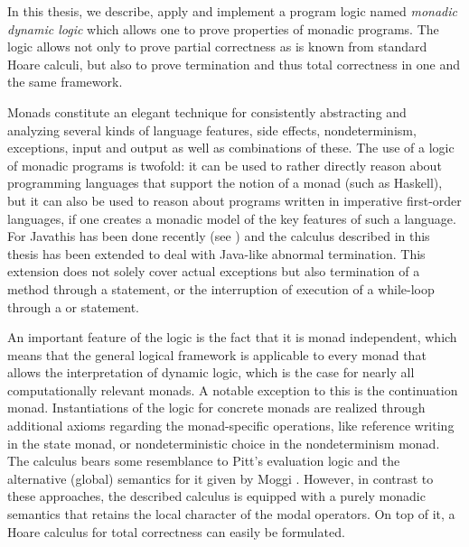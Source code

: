 In this thesis, we describe, apply and implement a program logic named
\emph{monadic dynamic logic} \cite{SchroederMossakowski:PDL} which allows one to
prove properties of monadic programs.   The logic allows
not only to prove partial correctness as is known from standard Hoare calculi,
but also to prove termination and thus total correctness in one and the same
framework.

Monads constitute an elegant technique for consistently abstracting and analyzing
several kinds of language features, \EG side effects, nondeterminism,
exceptions, input and output as well as combinations of these. The use of a
logic of monadic programs is twofold: it can be used to rather directly reason
about programming languages that support the notion of a monad (such as
Haskell), but it can also be used to reason about programs written in imperative
first-order languages, if one creates a monadic model of the key features of
such a language. For Java\TM this has been done recently (see
\cite{HuismanJacobs00}) and the calculus described in this thesis has been
extended to deal with Java\TM-like abnormal termination. This extension does not
solely cover actual exceptions but also termination of a method through a
 statement, or the interruption of execution of a while-loop
through a  or  statement.

An important feature of the logic is the fact that it is monad independent,
which means that the general logical framework is applicable to every monad that
allows the interpretation of dynamic logic, which is the case for nearly all
computationally relevant monads. A notable exception to this is the continuation
monad. Instantiations of the logic for concrete monads are realized through
additional axioms regarding the monad-specific operations, like reference
writing in the state monad, or nondeterministic choice in the nondeterminism
monad.  The calculus bears some resemblance to Pitt's evaluation logic
\cite{Pitts91} and the alternative (global) semantics for it given by Moggi
\cite{Moggi95}. However, in contrast to these approaches, the described calculus
is equipped with a purely monadic semantics that retains the local character of
the modal operators. On top of it, a Hoare calculus for total correctness can
easily be formulated.


